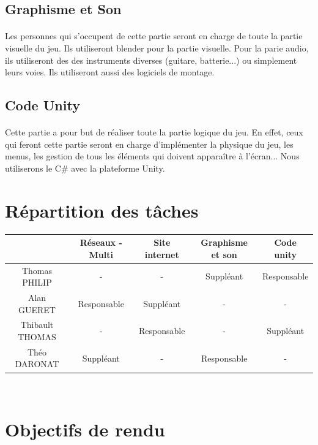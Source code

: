\documentclass[12pt]{report}
\begin{document}
		\subsection{Graphisme et Son}
		\paragraph{}
		Les personnes qui s'occupent de cette partie seront en charge de toute la partie visuelle du jeu. Ils utiliseront blender pour la partie visuelle. Pour la parie audio, ils utiliseront des
des instruments diverses (guitare, batterie...) ou simplement
leurs voies. Ils utiliseront aussi des logiciels de montage.\\

		\subsection{Code Unity}
		\paragraph{}
			Cette partie a pour but de réaliser toute la partie logique du jeu. En effet, ceux qui feront cette partie seront en charge d'implémenter la physique du jeu, les menus, les gestion de 
tous les éléments qui doivent apparaître à l'écran... Nous
utiliserons le C\# avec la plateforme Unity.\\

	\section{Répartition des tâches}	
	
	\begin{tabular}{|*{5}{c|}}
	\hline
		& Réseaux - Multi & Site internet & Graphisme et son & Code unity \\
		\hline
		Thomas PHILIP & - & - & Suppléant & Responsable \\
		\hline
		Alan GUERET & Responsable & Suppléant & - & - \\
		\hline
		Thibault THOMAS & - & Responsable & - & Suppléant \\
		\hline
		Théo DARONAT & Suppléant & - & Responsable & - \\
		\hline
	
	\end{tabular}
	\\
	
	\section{Objectifs de rendu}
	
\end{document}
